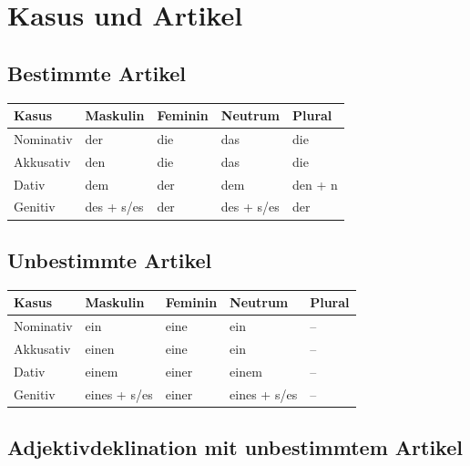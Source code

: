 \section{Kasus und Artikel}

\subsection{Bestimmte Artikel}

\begin{center}
\begin{tabular}{lllll}
\toprule
Kasus & Maskulin & Feminin & Neutrum & Plural \\
\midrule
Nominativ & der & die & das & die \\
Akkusativ & den & die & das & die \\
Dativ & dem & der & dem & den + n \\
Genitiv & des + s/es & der & des + s/es & der \\
\bottomrule
\end{tabular}
\end{center}

\subsection{Unbestimmte Artikel}

\begin{center}
\begin{tabular}{lllll}
\toprule
Kasus & Maskulin & Feminin & Neutrum & Plural \\
\midrule
Nominativ & ein & eine & ein & -- \\
Akkusativ & einen & eine & ein & -- \\
Dativ & einem & einer & einem & -- \\
Genitiv & eines + s/es & einer & eines + s/es & -- \\
\bottomrule
\end{tabular}
\end{center}

\subsection{Adjektivdeklination mit unbestimmtem Artikel}

